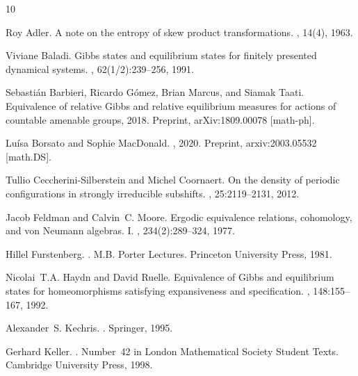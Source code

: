 \documentclass{amsproc}
\numberwithin{theorem}{section}
\theoremstyle{remark}
\theoremstyle{definition}
\theoremstyle{plain}
\begin{document}
\begin{thebibliography}{10}

Roy Adler.
\newblock A note on the entropy of skew product transformations.
, 14(4), 1963.

Viviane Baladi.
\newblock Gibbs states and equilibrium states for finitely presented dynamical
  systems.
, 62(1/2):239--256, 1991.

Sebasti{\'a}n Barbieri, Ricardo G{\'o}mez, Brian Marcus, and Siamak Taati.
\newblock Equivalence of relative Gibbs and relative equilibrium measures for
  actions of countable amenable groups, 2018.
\newblock Preprint, arXiv:1809.00078 [math-ph].

Lu{\'i}sa Borsato and Sophie MacDonald.
,
  2020.
\newblock Preprint, arxiv:2003.05532 [math.DS].

Tullio Ceccherini-Silberstein and Michel Coornaert.
\newblock On the density of periodic configurations in strongly irreducible
  subshifts.
, 25:2119--2131, 2012.

Jacob Feldman and Calvin~C. Moore.
\newblock Ergodic equivalence relations, cohomology, and von {Neumann}
  algebras. {I}.
, 234(2):289--324, 1977.

Hillel Furstenberg.
.
\newblock M.B. Porter Lectures. Princeton University Press, 1981.

Nicolai~T.A. Haydn and David Ruelle.
\newblock Equivalence of Gibbs and equilibrium states for homeomorphisms
  satisfying expansiveness and specification.
, 148:155--167, 1992.

Alexander~S. Kechris.
.
\newblock Springer, 1995.

Gerhard Keller.
.
\newblock Number~42 in London Mathematical Society Student Texts. Cambridge
  University Press, 1998.


\end{thebibliography}
\end{document}
